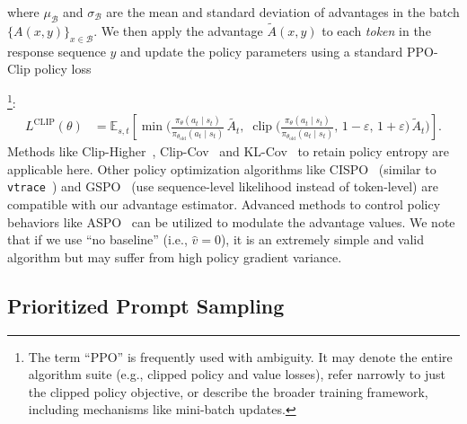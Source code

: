 where $\mu_{\mathcal{B}}$ and $\sigma_{\mathcal{B}}$ are the mean and standard deviation of advantages in the batch $\{A(x, y)\}_{x \in \mathcal{B}}$. We then apply the advantage $\tilde{A}(x, y)$ to each \emph{token} in the response sequence $y$ and update the policy parameters using a standard PPO-Clip policy loss~\cite{PPO}{\footnote{The term ``PPO'' is frequently used with ambiguity. It may denote the entire algorithm suite (e.g., clipped policy and value losses), refer narrowly to just the clipped policy objective, or describe the broader training framework, including mechanisms like mini-batch updates.}:
\begin{align}
L^{\text{CLIP}}(\theta) &= \mathbb{E}_{s, t}\!\left[\min\!\Bigg(
\frac{\pi_\theta(a_t\mid s_t)}{\pi_{\theta_{\text{old}}}(a_t\mid s_t)}\,\tilde{A_t},\;
\operatorname{clip}\!\Big(\frac{\pi_\theta(a_t\mid s_t)}{\pi_{\theta_{\text{old}}}(a_t\mid s_t)},\,1-\varepsilon,\,1+\varepsilon\Big)\,\tilde A_t
\Bigg)\right]. 
\end{align}
Methods like Clip-Higher~\cite{DAPO}, Clip-Cov~\cite{cui2025entropy} and KL-Cov~\cite{cui2025entropy} to retain policy entropy are applicable here. Other policy optimization algorithms like CISPO~\cite{CISPO} (similar to \texttt{vtrace}~\cite{espeholt2018impala,wu2025llamarl}) and GSPO~\cite{GSPO} (use sequence-level likelihood instead of token-level) are compatible with our advantage estimator. Advanced methods to control policy behaviors like ASPO~\cite{aspo} can be utilized to modulate the advantage values. We note that if we use ``no baseline'' (i.e., $\hat{v} = 0$), it is an extremely simple and valid algorithm but may suffer from high policy gradient variance.

\subsection{Prioritized Prompt Sampling}

}
